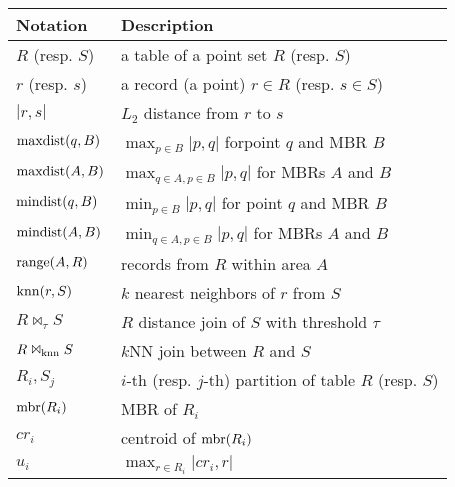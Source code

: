 \begin{table*}[!t]
\begin{minipage}{4.0in}
\begin{tabular}{|c|c|c|c|c|c|}
  \hline
\end{tabular}
\vspace{-2mm}
\caption{Comparing \name against other systems.}
\label{tb:func}
\vspace{-5mm}
\end{minipage}
\begin{minipage}{3.0in}
	\small
	\begin{tabular}{|l|l|}
      \hline
      Notation & Description\\
      \hline
      $R$ (resp. $S$) & a table of a point set $R$ (resp. $S$)\\
      \hline
      $r$ (resp. $s$) & a record (a point) $r \in R$ (resp. $s \in S$)\\
      \hline
      $|r, s|$ & $L_2$ distance from $r$ to $s$\\
      \hline
      $\operatorname{maxdist}(q, B)$ & $\max_{p \in B}|p, q|$ forpoint $q$ and MBR $B$\\
      \hline
      $\operatorname{maxdist}(A, B)$ & $\max_{q \in A, p \in B}|p, q|$ for MBRs $A$ and $B$\\
      \hline
      $\operatorname{mindist}(q, B)$ & $\min_{p \in B}|p, q|$ for point $q$ and MBR $B$\\
      \hline
      $\operatorname{mindist}(A, B)$ & $\min_{q \in A, p \in B}|p, q|$ for MBRs $A$ and $B$\\
      \hline
      $\operatorname{range}(A, R)$ & records from $R$ within area $A$\\
      \hline
      $\operatorname{knn}(r, S)$ & $k$ nearest neighbors of $r$ from $S$\\
      \hline
      $R \Join_{\tau} S$ & $R$ distance join of $S$ with threshold $\tau$ \\
      \hline
      $R \Join_{\operatorname{knn}} S$ & $k$NN join between $R$ and $S$ \\
      \hline
      $R_i, S_j$ & $i$-th (resp. $j$-th) partition of table $R$ (resp. $S$) \\
      \hline
      $\operatorname{mbr}(R_i)$ & MBR of $R_i$\\
      \hline
      $cr_i$ & centroid of $\operatorname{mbr}(R_i)$\\
      \hline
      $u_i$ & $\max_{r \in R_i}|cr_i, r|$ \\
      \hline
	\end{tabular}
    \vspace{-2mm}
	\caption{Frequently used notations.}
	\label{tb:notation}
	\vspace{-5mm}
\end{minipage}

\end{table*}

